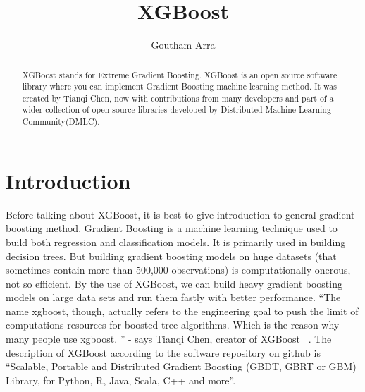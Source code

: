 
\title{XGBoost}


\author{Goutham Arra}




\begin{abstract} 
XGBoost stands for Extreme Gradient Boosting. XGBoost is an
open source software library where you can  implement Gradient Boosting machine
learning method. It was created by Tianqi Chen, now with contributions from many
developers and part of a wider collection of open source libraries developed by
Distributed Machine Learning Community(DMLC).
\end{abstract}



\maketitle


\section{Introduction}  

Before talking about XGBoost, it is best to give introduction to general
gradient boosting method. Gradient Boosting is a machine learning technique used
to build both regression and classification models. It is primarily used in
building decision trees. But building gradient boosting models on huge datasets
(that sometimes contain more than 500,000 observations) is computationally
onerous, not so efficient. By the use of XGBoost, we can build  heavy gradient
boosting models on large data sets and run them fastly with better performance.
``The name xgboost, though, actually refers to the engineering goal to push the
limit of computations resources for boosted tree algorithms. Which is the reason
why many people use xgboost. '' - says Tianqi Chen, creator of XGBoost ~\cite
{hid-sp18-401-XGBoost-MLmastery}. The description of XGBoost according to the
software repository on github is “Scalable, Portable and Distributed Gradient
Boosting (GBDT, GBRT or GBM) Library, for Python, R, Java, Scala, C++ and more”.



